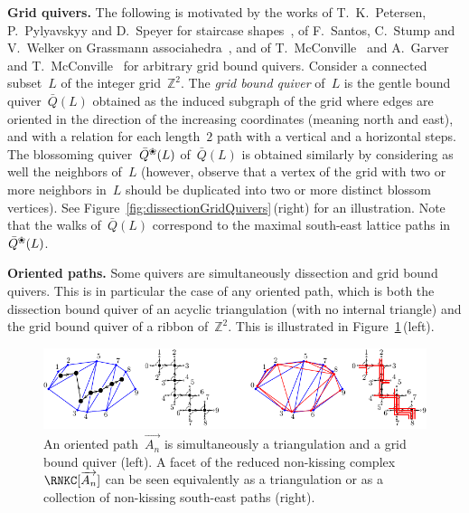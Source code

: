 \documentclass{amsart}
\theoremstyle{definition}
\newcommand{\Z}{\mathbb{Z}} %
\newcommand{\fref}[1]{Figure~\ref{#1}} %
\newcommand{\darkblue}{\color{darkblue}} %
\newcommand{\defn}[1]{\textsl{\darkblue #1}} %
\newcommand{\para}[1]{\medskip\noindent\textbf{#1.}} %
\DeclareRobustCommand{\exmAn}{\overrightarrow{A_n}} %
\newcommand{\blossom}{^\text{\ding{96}}} %
\begin{document}
\para{Grid quivers}
The following is motivated by the works of T.~K.~Petersen, P.~Pylyavskyy and D.~Speyer for staircase shapes~\cite{PetersenPylyavskyySpeyer}, of F.~Santos, C.~Stump and V.~Welker on Grassmann associahedra~\cite{SantosStumpWelker}, and of T.~McConville~\cite{McConville} and A.~Garver and T.~McConville~\cite{GarverMcConville-grid} for arbitrary grid bound quivers.
Consider a connected subset~$L$ of the integer grid~$\Z^2$.
The \defn{grid bound quiver} of~$L$ is the gentle bound quiver~$\bar Q(L)$ obtained as the induced subgraph of the grid where edges are oriented in the direction of the increasing coordinates (meaning north and east), and with a relation for each length~$2$ path with a vertical and a horizontal steps.
The blossoming quiver~$\bar Q\blossom(L)$ of~$\bar Q(L)$ is obtained similarly by considering as well the neighbors of~$L$ (however, observe that a vertex of the grid with two or more neighbors in~$L$ should be duplicated into two or more distinct blossom vertices).
See \fref{fig:dissectionGridQuivers}\,(right) for an illustration.
Note that the walks of~$\bar Q(L)$ correspond to the maximal south-east lattice paths in~$\bar Q\blossom(L)$.

\para{Oriented paths}
Some quivers are simultaneously dissection and grid bound quivers. This is in particular the case of any oriented path, which is both the dissection bound quiver of an acyclic triangulation (with no internal triangle) and the grid bound quiver of a ribbon of~$\Z^2$. This is illustrated in \fref{fig:exmBijectionAssociahedron}\,(left).

\begin{figure}[t]
	\capstart
	\centerline{\includegraphics[scale=1.4]{exmBijectionAssociahedron}}
	\caption{An oriented path~$\exmAn$ is simultaneously a triangulation and a grid bound quiver (left). A facet of the reduced non-kissing complex~$\RNKC[\exmAn]$ can be seen equivalently as a triangulation or as a collection of non-kissing south-east paths (right).}
	\label{fig:exmBijectionAssociahedron}
\end{figure}
\end{document}
